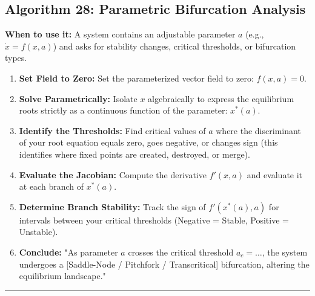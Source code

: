 \documentclass[11pt, a4paper]{report}
\begin{document}
\subsection*{Algorithm 28: Parametric Bifurcation Analysis}
\textbf{When to use it:} A system contains an adjustable parameter $a$ (e.g., $\dot{x}=f(x, a)$) and asks for stability changes, critical thresholds, or bifurcation types.
\begin{enumerate}[label=\textbf{\arabic*.}]
    \item \textbf{Set Field to Zero:} Set the parameterized vector field to zero: $f(x, a) = 0$.
    \item \textbf{Solve Parametrically:} Isolate $x$ algebraically to express the equilibrium roots strictly as a continuous function of the parameter: $x^*(a)$.
    \item \textbf{Identify the Thresholds:} Find critical values of $a$ where the discriminant of your root equation equals zero, goes negative, or changes sign (this identifies where fixed points are created, destroyed, or merge).
    \item \textbf{Evaluate the Jacobian:} Compute the derivative $f'(x,a)$ and evaluate it at each branch of $x^*(a)$.
    \item \textbf{Determine Branch Stability:} Track the sign of $f'(x^*(a), a)$ for intervals between your critical thresholds (Negative = Stable, Positive = Unstable).
    \item \textbf{Conclude:} "As parameter $a$ crosses the critical threshold $a_c = \dots$, the system undergoes a [Saddle-Node / Pitchfork / Transcritical] bifurcation, altering the equilibrium landscape."
\end{enumerate}
\vspace{1em}
\noindent\rule{\textwidth}{0.4pt}
\vspace{1em}
\end{document}

